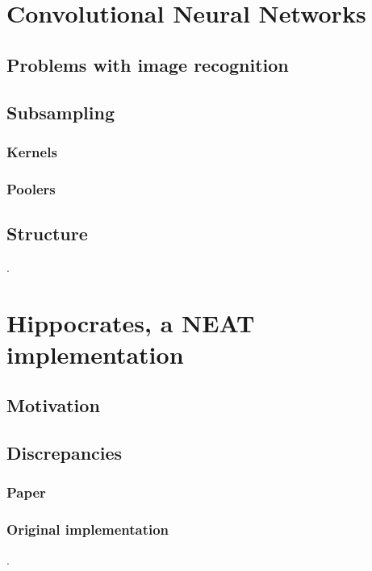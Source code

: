 \documentclass[11pt]{article}
\begin{document}
	\section{Convolutional Neural Networks}
		\subsection{Problems with image recognition}
			
		\subsection{Subsampling}
			
			\subsubsection{Kernels}
			
			\subsubsection{Poolers}
			
		\subsection{Structure}
			.
	\newpage

	\section{Hippocrates, a NEAT implementation}
		\subsection{Motivation}
			
		\subsection{Discrepancies}
			\subsubsection{Paper}
				
			\subsubsection{Original implementation}
				.
\end{document}
